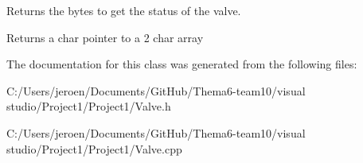 Returns the bytes to get the status of the valve. 

\begin{DoxyReturn}{Returns}
a char pointer to a 2 char array 
\end{DoxyReturn}


The documentation for this class was generated from the following files\+:\begin{DoxyCompactItemize}
\item 
C\+:/\+Users/jeroen/\+Documents/\+Git\+Hub/\+Thema6-\/team10/visual studio/\+Project1/\+Project1/Valve.\+h\item 
C\+:/\+Users/jeroen/\+Documents/\+Git\+Hub/\+Thema6-\/team10/visual studio/\+Project1/\+Project1/Valve.\+cpp\end{DoxyCompactItemize}
